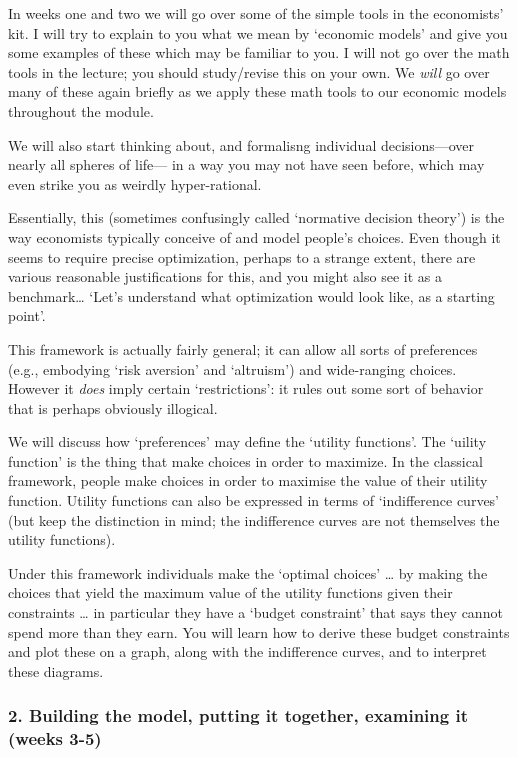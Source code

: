 \documentclass[]{article}
\begin{document}
In weeks one and two we will go over some of the simple tools in the economists' kit. I will try to explain to you what we mean by `economic models' and give you some examples of these which may be familiar to you. I will not go over the math tools in the lecture; you should study/revise this on your own. We \emph{will} go over many of these again briefly as we apply these math tools to our economic models throughout the module.

We will also start thinking about, and formalisng individual decisions---over nearly all spheres of life--- in a way you may not have seen before, which may even strike you as weirdly hyper-rational.

Essentially, this (sometimes confusingly called `normative decision theory') is the way economists typically conceive of and model people's choices. Even though it seems to require precise optimization, perhaps to a strange extent, there are various reasonable justifications for this, and you might also see it as a benchmark\ldots{} `Let's understand what optimization would look like, as a starting point'.

This framework is actually fairly general; it can allow all sorts of preferences (e.g., embodying `risk aversion' and `altruism') and wide-ranging choices. However it \emph{does} imply certain `restrictions': it rules out some sort of behavior that is perhaps obviously illogical.

We will discuss how `preferences' may define the `utility functions'. The `uility function' is the thing that make choices in order to maximize. In the classical framework, people make choices in order to maximise the value of their utility function. Utility functions can also be expressed in terms of `indifference curves' (but keep the distinction in mind; the indifference curves are not themselves the utility functions).

Under this framework individuals make the `optimal choices' \ldots{} by making the choices that yield the maximum value of the utility functions given their constraints \ldots{} in particular they have a `budget constraint' that says they cannot spend more than they earn. You will learn how to derive these budget constraints and plot these on a graph, along with the indifference curves, and to interpret these diagrams.

\medskip

\hypertarget{building-the-model-putting-it-together-examining-it-weeks-3-5}{%
\subsubsection{2. Building the model, putting it together, examining it (weeks 3-5)}\label{building-the-model-putting-it-together-examining-it-weeks-3-5}}
\end{document}
